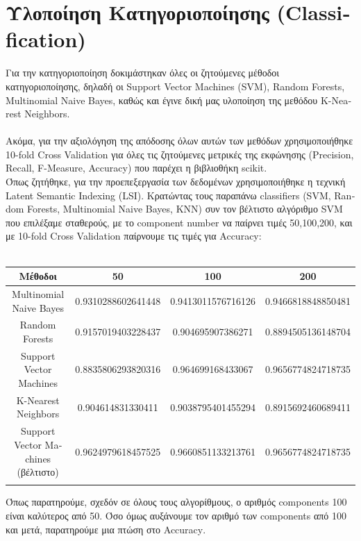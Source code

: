 \documentclass{article}
\begin{document}
\section{Υλοποίηση Κατηγοριοποίησης \textlatin{(Classification)}}
Για την κατηγοριοποίηση δοκιμάστηκαν όλες οι ζητούμενες μέθοδοι κατηγοριοποίησης, δηλαδή οι 
\textlatin{Support Vector Machines (SVM), Random Forests, Multinomial Naive Bayes}, καθώς και 
έγινε δική μας υλοποίηση της μεθόδου \textlatin{K-Nearest Neighbors}.\\\\
Ακόμα, για την αξιολόγηση της απόδοσης όλων αυτών των μεθόδων χρησιμοποιήθηκε
\textlatin{10-fold Cross Validation} για όλες τις ζητούμενες μετρικές της εκφώνησης
\textlatin{(Precision, Recall, F-Measure, Accuracy)} που παρέχει η βιβλιοθήκη \textlatin{scikit}.\\
Όπως ζητήθηκε, για την προεπεξεργασία των δεδομένων χρησιμοποιήθηκε η τεχνική 
\textlatin{Latent Semantic Indexing (LSI)}. Κρατώντας τους παραπάνω \textlatin{classifiers} 
(\textlatin{SVM, Random Forests, Multinomial Naive Bayes, KNN}) συν τον βέλτιστο αλγόριθμο \textlatin{SVM} 
που επιλέξαμε σταθερούς, με το 
\textlatin{component number} να παίρνει τιμές 50,100,200, και με \textlatin{10-fold Cross Validation}
παίρνουμε τις τιμές για \textlatin{Accuracy}:\\\\

\renewcommand{\arraystretch}{2.5}
\begin{tabular}{ c c|c|c|}
\hline  
 Μέθοδοι & 50 & 100 & 200\\
\hline 
\textlatin{Multinomial Naive Bayes} & 0.9310288602641448 & 0.9413011576716126	 & 0.9466818848850481\\
\hline 
\textlatin{Random Forests} & 0.9157019403228437 & 0.904695907386271 & 0.8894505136148704\\
\hline
\textlatin{Support Vector Machines} & 0.8835806293820316 & 0.964699168433067 & 0.9656774824718735\\
\hline
\textlatin{K-Nearest Neighbors} & 0.904614831330411 & 0.9038795401455294 & 0.8915692460689411\\
\hline
\textlatin{Support Vector Machines} (βέλτιστο) & 0.9624979618457525 & 0.9660851133213761 & 0.9656774824718735\\
\hline\\
\end{tabular}

Όπως παρατηρούμε, σχεδόν σε όλους τους αλγορίθμους, ο αριθμός \textlatin{components} 100 είναι καλύτερος από 
50. Όσο όμως αυξάνουμε τον αριθμό των \textlatin{components} από 100 και μετά, παρατηρούμε μια πτώση στο 
\textlatin{Accuracy}.\\\\
\end{document}

